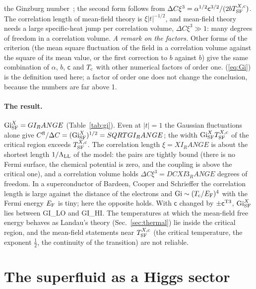 \documentclass[aps,prd,onecolumn,superscriptaddress,nofootinbib,floatfix,longbibliography]{revtex4-2}
\newcommand{\LL}{{\rm LL}}
\newcommand{\SF}{{\rm SF}}
\begin{document}
the Ginzburg number~\cite{Levanyuk1959,Ginzburg1960}; the second form follows from $\Delta C\xi^3=\alpha^{1/2}\mathsf c^{3/2}/(2bT^{X,{\rm c}}_\SF)$. The
correlation length of mean-field theory is $\xi|t|^{-1/2}$, and mean-field theory needs a large specific-heat jump per correlation
volume, $\Delta C\xi^3\gg1$: many degrees of freedom in a correlation volume. \emph{A remark on the factors.} Other forms of the
criterion (the mean square fluctuation of the field in a correlation volume against the square of its mean value, or the first
correction to $b$ against $b$) give the same combination of $\alpha$, $b$, $\mathsf c$ and $T_{\rm c}$ with other numerical factors of order
one. (\ref{eq:Gi}) is the definition used here; a factor of order one does not change the conclusion, because the numbers are far
above 1.

\paragraph*{The result.} ${\rm Gi}^X_\SF={{GI_RANGE}}$ (Table~\ref{tab:gi}). Even at $|t|=1$ the Gaussian fluctuations alone give
$C^{\rm fl}/\Delta C=({\rm Gi}^X_\SF)^{1/2}={{SQRTGI_RANGE}}$; the width ${\rm Gi}^X_\SF T^{X,{\rm c}}_\SF$ of the critical region exceeds
$T^{X,{\rm c}}_\SF$. The correlation length $\xi={{XI_RANGE}}$ is about the shortest length $1/\Lambda_\LL$ of the model: the pairs are tightly
bound (there is no Fermi surface, the chemical potential is zero, and the coupling is above the critical one), and a correlation
volume holds $\Delta C\xi^3={{DCXI3_RANGE}}$ degrees of freedom. In a superconductor of Bardeen, Cooper and Schrieffer the correlation
length is large against the distance of the electrons and ${\rm Gi}\sim(T_{\rm c}/E_{\rm F})^4$ with the Fermi energy $E_{\rm F}$ is tiny; here
the opposite holds. With $\mathsf c$ changed by $\pm\mathsf c^{\rm T3}$, ${\rm Gi}^X_\SF$ lies between {{GI_LO}} and {{GI_HI}}. The temperatures at
which the mean-field free energy behaves as Landau's theory (Sec.~\ref{sec:thermal}) lie inside the critical region, and the
mean-field statements near $T^{X,{\rm c}}_\SF$ (the critical temperature, the exponent $\frac12$, the continuity of the transition) are
not reliable.

\section{The superfluid as a Higgs sector}
\label{sec:higgs}
\end{document}
